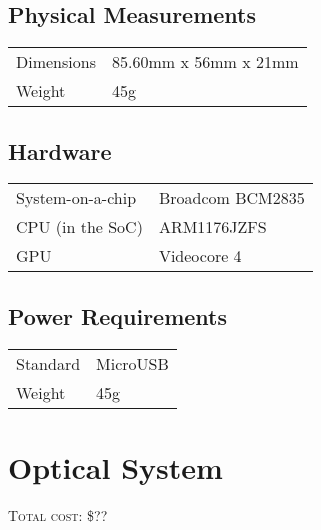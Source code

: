 \subsection{Physical Measurements}

\begin{tabular}{p{} p{}}
\hline
Dimensions & 85.60mm x 56mm x 21mm \\
Weight & 45g \\ \hline
\end{tabular}

\subsection{Hardware}

\begin{tabular}{p{} p{}} 
\hline
System-on-a-chip & Broadcom BCM2835 \\
CPU (in the SoC) & ARM1176JZFS \\
GPU & Videocore 4 \\ \hline
\end{tabular}

\subsection{Power Requirements}

\begin{tabular}{p{} p{}}
\hline
Standard & MicroUSB \\
Weight & 45g \\ \hline
\end{tabular}

\section{Optical System}
\textsc{Total cost: \$??}
